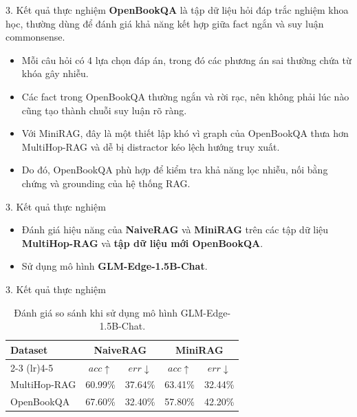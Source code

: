 \documentclass[11pt]{beamer}
\begin{document}
    \begin{frame}{3. Kết quả thực nghiệm}
        \textbf{OpenBookQA} là tập dữ liệu hỏi đáp trắc nghiệm khoa học, thường dùng để đánh giá khả năng kết hợp giữa fact ngắn và suy luận commonsense.

        \vspace{0.25cm}

        \begin{itemize}
            \item Mỗi câu hỏi có 4 lựa chọn đáp án, trong đó các phương án sai thường chứa từ khóa gây nhiễu.
            \item Các fact trong OpenBookQA thường ngắn và rời rạc, nên không phải lúc nào cũng tạo thành chuỗi suy luận rõ ràng.
            \item Với MiniRAG, đây là một thiết lập khó vì graph của OpenBookQA thưa hơn MultiHop-RAG và dễ bị distractor kéo lệch hướng truy xuất.
            \item Do đó, OpenBookQA phù hợp để kiểm tra khả năng lọc nhiễu, nối bằng chứng và grounding của hệ thống RAG.
        \end{itemize}
    \end{frame}

    \begin{frame}{3. Kết quả thực nghiệm}
        \begin{itemize}
            \item Đánh giá hiệu năng của \textbf{NaiveRAG} và \textbf{MiniRAG} trên các tập dữ liệu \textbf{MultiHop-RAG} và \textbf{tập dữ liệu mới OpenBookQA}.
            \item Sử dụng mô hình \textbf{GLM-Edge-1.5B-Chat}.
        \end{itemize}
    \end{frame}

    \begin{frame}{3. Kết quả thực nghiệm}
    \begin{table}[t]
    \centering
    \small
    \setlength{\tabcolsep}{12pt}
    \renewcommand{\arraystretch}{1.15}

    \begin{tabular}{lcccc}
    \toprule
    \textbf{Dataset}
    & \multicolumn{2}{c}{NaiveRAG}
    & \multicolumn{2}{c}{MiniRAG} \\

    \cmidrule(lr){2-3}
    \cmidrule(lr){4-5}

    & $acc \uparrow$ & $err \downarrow$
    & $acc \uparrow$ & $err \downarrow$ \\

    \midrule
    MultiHop-RAG
    & 60.99\% & 37.64\%
    & 63.41\% & 32.44\% \\

    OpenBookQA
    & 67.60\% & 32.40\%
    & 57.80\% & 42.20\% \\

    \bottomrule
    \end{tabular}
    \caption{Đánh giá so sánh khi sử dụng mô hình GLM-Edge-1.5B-Chat.}
    \end{table}
\end{frame}
\end{document}
